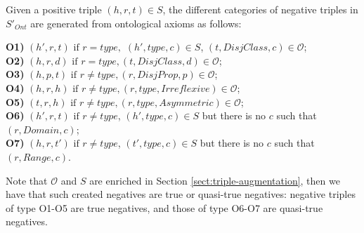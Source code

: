 \documentclass[sigconf]{acmart}
\newcommand{\yue}[1]{{\color{blue}#1}}
\begin{document}
Given a positive triple $(h,r,t)\in S$, the different categories of negative triples in $S'_{Ont}$ are generated from ontological axioms as follows:\\
\begin{small}
\noindent \textbf{O1)} $(h',r,t) \mbox{ if } r=type,
$ $(h', type,c)\in S$,  $ (t,DisjClass,c)\in \mathcal{O}$;\\
\textbf{O2)} $(h,r,d)\mbox{ if } r=type, 
(t,DisjClass,d)\in \mathcal{O}$;\\
\textbf{O3)} $(h,p,t)\mbox{ if } r\neq type, (r,DisjProp,p)\in \mathcal{O}$;\\
\textbf{O4)} $(h,r,h)\mbox{ if } r\neq type, (r,type,Irreflexive)\in \mathcal{O}$;\\
\textbf{O5)} $(t,r,h)\mbox{ if } r\neq type, (r,type,Asymmetric)\in \mathcal{O}$;\\
\textbf{O6)} $(h',r,t)\mbox{ if }  r\neq type$, $(h',type,c)\in S$ but there is no $c$ such that   $(r,Domain,c)$;\\
\textbf{O7)} $(h,r,t')\mbox{ if }  r\neq type$, $(t',type,c)\in S$ but there is no $c$ such that   $(r,Range,c)$.
\end{small}

Note that $\mathcal{O}$ and $S$ are enriched in Section \ref{sect:triple-augmentation}, then we have that  such created negatives are true or quasi-true negatives: 
    negative triples of  type O1-O5 are true negatives, and those of  type O6-O7 are quasi-true negatives.
\end{document}
